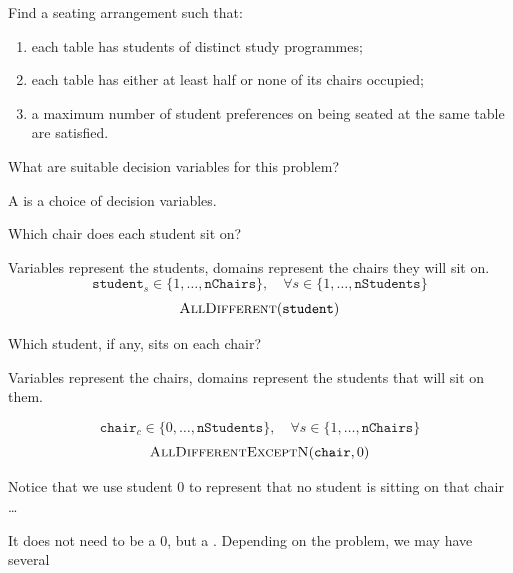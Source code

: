 \documentclass{cons-beamer}
\begin{document}
\begin{frame}[t]
\begin{example}
\begin{minipage}[c]{0.66\linewidth}
      Find a seating arrangement such that:
      \begin{enumerate}
        \item each table has students of distinct study programmes;
        \item each table has either at least half or none of its chairs occupied;
        \item a maximum number of student preferences on being seated at the same table are satisfied.
      \end{enumerate}
    \end{minipage}
  \end{example}\vfill
 \vfill
  What are suitable decision variables for this problem?
\end{frame}

\begin{frame}
  A  is a choice of decision variables.
  \vfill

  \begin{example}
      Which chair does each student sit on?
    
    Variables represent the students, domains represent the chairs they will sit on.
    \footnotesize
    \[ \mathtt{student}_s \in \{1, \ldots, \mathtt{nChairs}\}, \quad \forall s \in \{1, \ldots, \mathtt{nStudents}\} \]
    \[ \textsc{AllDifferent}(\mathtt{student}) \]
    \normalsize
     \vfill

      Which student, if any, sits on each chair?

    Variables represent the chairs, domains represent the students that will sit on them.
    
    \footnotesize
    \[ \mathtt{chair}_c \in \{0, \ldots, \mathtt{nStudents}\}, \quad \forall s \in \{1, \ldots, \mathtt{nChairs}\} \]
    \[ \textsc{AllDifferentExceptN}(\mathtt{chair}, 0) \]
    \normalsize
    \vfill

    \alert{Notice that we use student $0$ to represent that no student is sitting on that chair \dots}

    It does not need to be a $0$, but a . Depending on the problem, we may have several 
  \end{example}\vfill
\end{frame}
\end{document}
